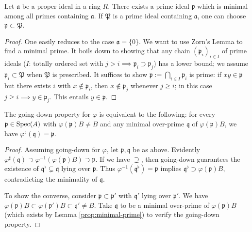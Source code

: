 \begin{lemma}\label{prop:minimal-prime}
	Let $\mathfrak{a}$ be a proper ideal in a ring $R$. There exists a prime ideal $\mathfrak{p}$ which is minimal among all primes containing $\mathfrak{a}$. If $\mathfrak{P}$ is a prime ideal containing $\mathfrak{a}$, one can choose $\mathfrak{p} \subset \mathfrak{P}$.
\end{lemma}
\begin{proof}
	One easily reduces to the case $\mathfrak{a} = \{0\}$. We want to use Zorn's Lemma to find a minimal prime. It boils down to showing that any chain $(\mathfrak{p}_i)_{i \in I}$ of prime ideals ($I$: totally ordered set with $j > i \implies \mathfrak{p}_i \supset \mathfrak{p}_j$) has a lower bound; we assume $\mathfrak{p}_i \subset \mathfrak{P}$ when $\mathfrak{P}$ is prescribed. It suffices to show $\mathfrak{p} := \bigcap_{i \in I} \mathfrak{p}_i$ is prime: if $xy \in \mathfrak{p}$ but there exists $i$ with $x \notin \mathfrak{p}_i$, then $x \notin \mathfrak{p}_j$ whenever $j \geq i$; in this case $j \geq i \implies y \in \mathfrak{p}_j$. This entails $y \in \mathfrak{p}$.
\end{proof}

\begin{lemma}
	The going-down property for $\varphi$ is equivalent to the following: for every $\mathfrak{p} \in \operatorname{Spec}(A)$ with $\varphi(\mathfrak{p})B \neq B$ and any minimal over-prime $\mathfrak{q}$ of $\varphi(\mathfrak{p})B$, we have $\varphi^\sharp(\mathfrak{q}) = \mathfrak{p}$.
\end{lemma}
\begin{proof}
	Assuming going-down for $\varphi$, let $\mathfrak{p}, \mathfrak{q}$ be as above. Evidently $\varphi^\sharp(\mathfrak{q}) \supset \varphi^{-1}(\varphi(\mathfrak{p})B) \supset \mathfrak{p}$. If we have $\supsetneq$, then going-down guarantees the existence of $\mathfrak{q}^\flat \subsetneq \mathfrak{q}$ lying over $\mathfrak{p}$. Thus $\varphi^{-1}(\mathfrak{q}^\flat) = \mathfrak{p}$ implies $\mathfrak{q}^\flat \supset \varphi(\mathfrak{p})B$, contradicting the minimality of $\mathfrak{q}$.
	
	To show the converse, consider $\mathfrak{p} \subset \mathfrak{p}'$ with $\mathfrak{q}'$ lying over $\mathfrak{p}'$. We have $\varphi(\mathfrak{p})B \subset \varphi(\mathfrak{p}')B \subset \mathfrak{q}' \neq B$. Take $\mathfrak{q}$ to be a minimal over-prime of $\varphi(\mathfrak{p})B$ (which exists by Lemma \ref{prop:minimal-prime}) to verify the going-down property.
\end{proof}


